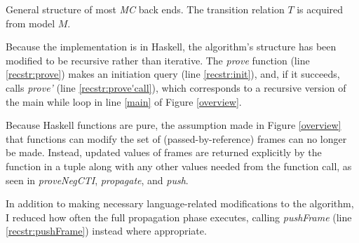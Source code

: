 \documentclass[12pt,a4paper,twoside,openright]{report}
\begin{document}
{{
\begin{algorithm}[t]
\DontPrintSemicolon
{}
\caption{General structure of most \emph{MC} back ends. The transition relation $T$ is acquired
from model $M$.}
\label{recstr}
\end{algorithm}

Because the implementation is in Haskell, the
algorithm's structure has been modified to be recursive rather than iterative.
The {\it prove} function (line \ref{recstr:prove}) makes an initiation query
(line \ref{recstr:init}), and, if it succeeds, calls
{\it prove'} (line \ref{recstr:prove'call}),
which corresponds to a recursive version of the main while loop
in line \ref{main} of Figure \ref{overview}.

Because Haskell functions are pure, the assumption made in Figure \ref{overview}
that functions can modify the set of (passed-by-reference) frames can no longer be made.
Instead, updated values of frames are returned explicitly by the function in
a tuple along with any other values needed from the function call, as seen in
{\it proveNegCTI}, {\it propagate}, and {\it push}.

In addition to making necessary language-related modifications to the algorithm, I 
reduced how often the full propagation phase executes, calling {\it pushFrame}
(line \ref{recstr:pushFrame}) instead where appropriate.

}}
\end{document}
